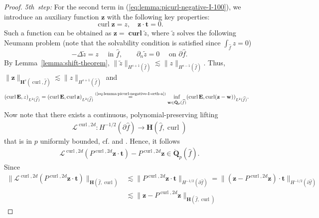 \documentclass{article}
\begin{document}
\begin{proof}
\emph{5th~step:} For the
second term in (\ref{eq:lemma:picurl-negative-I-100}), we introduce an auxiliary function ${\mathbf{z}}$ with the
following key properties:
\[
\operatorname{curl}{\mathbf{z}}=z,\quad{\mathbf{z}}\cdot{\mathbf{t}}=0. 
\]
Such a function can be obtained as ${\mathbf{z}}%
=\operatorname{\mathbf{curl}}\widetilde{z}$, where $\widetilde{z}$
solves the following Neumann problem (note that the solvability condition is satisfied 
since $\int_{\widehat{f}}z=0$)
\[
-\Delta\widetilde{z}=z\quad\mbox{ in }\widehat{f},\qquad\partial_{n}\widetilde{z}%
=0\quad\mbox{ on }\partial \widehat{f}.
\]
By Lemma~\ref{lemma:shift-theorem}, $\|\widetilde z\|_{H^{s+1}(\widehat f)} 
\lesssim \|z\|_{H^{s-1}(\widehat f)}$. Thus,  
$\|{\mathbf z}\|_{{\mathbf H}^s(\operatorname*{curl},\widehat f)} 
\lesssim \|z\|_{H^{s+1}(\widehat f)}$
and
\begin{align*}
(\operatorname{curl}{\mathbf{E}},z)_{L^{2}(\widehat{f})}  &  =(\operatorname{curl}%
{\mathbf{E}},\operatorname{curl}{\mathbf{z}})_{L^{2}(\widehat{f})}%
\overset{\text{(\ref{eq:lemma:picurl-negative-I-orth-a})}}{=}\inf
_{{\mathbf{w}}\in\mathring{\mathbf{Q}}_{p}(\widehat{f})}(\operatorname{curl}{\mathbf{E}%
},\operatorname{curl}({\mathbf{z}}-{\mathbf{w}}))_{L^{2}(\widehat{f})}.
\end{align*}
Now note that there exists a continuous, polynomial-preserving lifting
\begin{align*}
\boldsymbol{\mathcal{L}}^{\operatorname*{curl},2d}:H^{-1/2}(\partial \widehat{f}) \rightarrow {\mathbf{H}}(\widehat{f},\operatorname*{curl})
\end{align*}
that is in $p$ uniformly bounded, cf. \cite{ainsworth-demkowicz09} and \cite[eq.~(164)]{demkowicz08}. Hence, it follows
\begin{align*}
\boldsymbol{\mathcal{L}}^{\operatorname*{curl},2d}(P^{\operatorname*{curl},2d}{\mathbf{z}} \cdot \mathbf{t}) - P^{\operatorname*{curl},2d}{\mathbf{z}} \in \mathring{\mathbf{Q}}_p(\widehat{f}).
\end{align*}
Since
\begin{align*}
\|\boldsymbol{\mathcal{L}}^{\operatorname*{curl},2d}(P^{\operatorname*{curl},2d}{\mathbf{z}} \cdot \mathbf{t})\|_{\mathbf{H}(\widehat{f},\operatorname{curl})} &\lesssim \|P^{\operatorname*{curl},2d}{\mathbf{z}} \cdot \mathbf{t}\|_{H^{-1/2}(\partial\widehat{f})} = \|(\mathbf{z}-P^{\operatorname*{curl},2d}{\mathbf{z}}) \cdot \mathbf{t}\|_{H^{-1/2}(\partial\widehat{f})} \\
&\lesssim \|\mathbf{z} - P^{\operatorname*{curl},2d}{\mathbf{z}}\|_{\mathbf{H}(\widehat{f},\operatorname{curl})}

\end{align*}
\end{proof}
\end{document}
